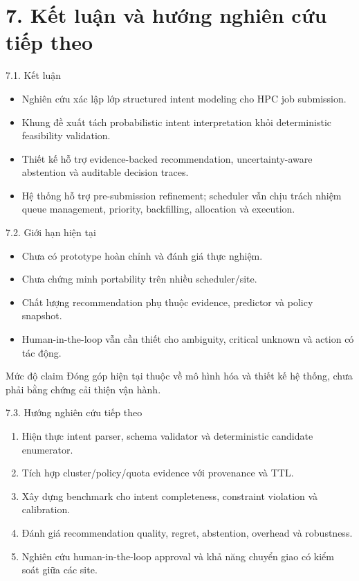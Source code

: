 \section{7. Kết luận và hướng nghiên cứu tiếp theo}

\begin{frame}[t]{7.1. Kết luận}
\small
\begin{itemize}
  \item Nghiên cứu xác lập lớp structured intent modeling cho HPC job submission.
  \item Khung đề xuất tách probabilistic intent interpretation khỏi deterministic feasibility validation.
  \item Thiết kế hỗ trợ evidence-backed recommendation, uncertainty-aware abstention và auditable decision traces.
  \item Hệ thống hỗ trợ pre-submission refinement; scheduler vẫn chịu trách nhiệm queue management, priority, backfilling, allocation và execution.
\end{itemize}
\end{frame}

\begin{frame}[t]{7.2. Giới hạn hiện tại}
\small
\begin{itemize}
  \item Chưa có prototype hoàn chỉnh và đánh giá thực nghiệm.
  \item Chưa chứng minh portability trên nhiều scheduler/site.
  \item Chất lượng recommendation phụ thuộc evidence, predictor và policy snapshot.
  \item Human-in-the-loop vẫn cần thiết cho ambiguity, critical unknown và action có tác động.
\end{itemize}
\begin{block}{Mức độ claim}
Đóng góp hiện tại thuộc về mô hình hóa và thiết kế hệ thống, chưa phải bằng chứng cải thiện vận hành.
\end{block}
\end{frame}

\begin{frame}[t]{7.3. Hướng nghiên cứu tiếp theo}
\small
\begin{enumerate}
  \item Hiện thực intent parser, schema validator và deterministic candidate enumerator.
  \item Tích hợp cluster/policy/quota evidence với provenance và TTL.
  \item Xây dựng benchmark cho intent completeness, constraint violation và calibration.
  \item Đánh giá recommendation quality, regret, abstention, overhead và robustness.
  \item Nghiên cứu human-in-the-loop approval và khả năng chuyển giao có kiểm soát giữa các site.
\end{enumerate}
\end{frame}


